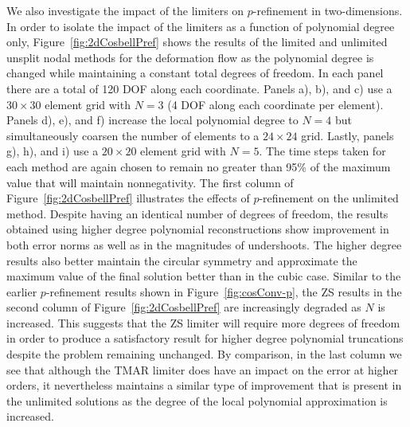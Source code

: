 \documentclass{ametsoc}
\begin{document}
We also investigate the impact of the limiters on $p$-refinement in two-dimensions. In order to isolate the impact of the limiters as a function of polynomial degree only, Figure~\ref{fig:2dCosbellPref} shows the results of the limited and unlimited unsplit nodal methods for the deformation flow as the polynomial degree is changed while maintaining a constant total degrees of freedom. In each panel there are a total of 120 DOF along each coordinate. Panels a), b), and c) use a $30 \times 30$ element grid with $N=3$ (4 DOF along each coordinate per element). Panels d), e), and f) increase the local polynomial degree to $N=4$ but simultaneously coarsen the number of elements to a $24 \times 24$ grid. Lastly, panels g), h), and i) use a $20 \times 20$ element grid with $N=5$. The time steps taken for each method are again chosen to remain no greater than 95\% of the maximum value that will maintain nonnegativity. The first column of Figure~\ref{fig:2dCosbellPref} illustrates the effects of $p$-refinement on the unlimited method. Despite having an identical number of degrees of freedom, the results obtained using higher degree polynomial reconstructions show improvement in both error norms as well as in the magnitudes of undershoots. The higher degree results also better maintain the circular symmetry and approximate the maximum value of the final solution better than in the cubic case. Similar to the earlier $p$-refinement results shown in Figure~\ref{fig:cosConv-p}, the ZS results in the second column of Figure~\ref{fig:2dCosbellPref} are increasingly degraded as $N$ is increased. This suggests that the ZS limiter will require more degrees of freedom in order to produce a satisfactory result for higher degree polynomial truncations despite the problem remaining unchanged. By comparison, in the last column we see that although the TMAR limiter does have an impact on the error at higher orders, it nevertheless maintains a similar type of improvement that is present in the unlimited solutions as the degree of the local polynomial approximation is increased.
\end{document}
